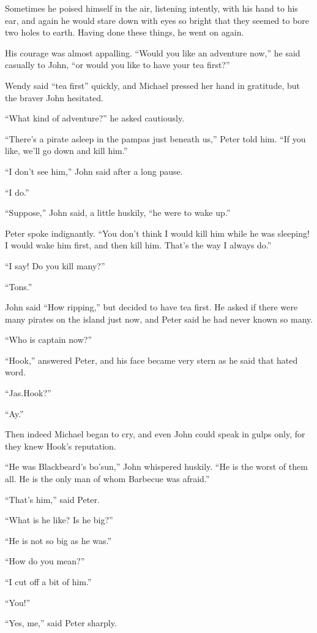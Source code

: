 Sometimes he poised himself in the air,
listening intently, with his hand to his ear,
and again he would stare down with eyes so bright that they seemed to bore two holes to earth.
Having done these things, he went on again.

His courage was almost appalling.
“Would you like an adventure now,” he said casually to John,
“or would you like to have your tea first?”

Wendy said “tea first” quickly, and Michael pressed her hand in gratitude,
but the braver John hesitated.

“What kind of adventure?\@” he asked cautiously.

“There’s a pirate asleep in the pampas just beneath us,” Peter told him.
“If you like, we’ll go down and kill him.”

“I don’t see him,” John said after a long pause.

“I do.”

“Suppose,” John said, a little huskily, “he were to wake up.”

Peter spoke indignantly.
“You don’t think I would kill him while he was sleeping!
I would wake him first, and then kill him.
That’s the way I always do.”

“I say!
Do you kill many?”

“Tons.”

John said “How ripping,” but decided to have tea first.
He asked if there were many pirates on the island just now,
and Peter said he had never known so many.

“Who is captain now?”

“Hook,” answered Peter, and his face became very stern as he said that hated word.

“Jas.\@ Hook?”

“Ay.”

Then indeed Michael began to cry, and even John could speak in gulps only, for they knew Hook’s reputation.

“He was Blackbeard’s bo’sun,” John whispered huskily.
“He is the worst of them all.
He is the only man of whom Barbecue was afraid.”

“That’s him,” said Peter.

“What is he like?
Is he big?”

“He is not so big as he was.”

“How do you mean?”

“I cut off a bit of him.”

“You!”

“Yes, me,” said Peter sharply.

